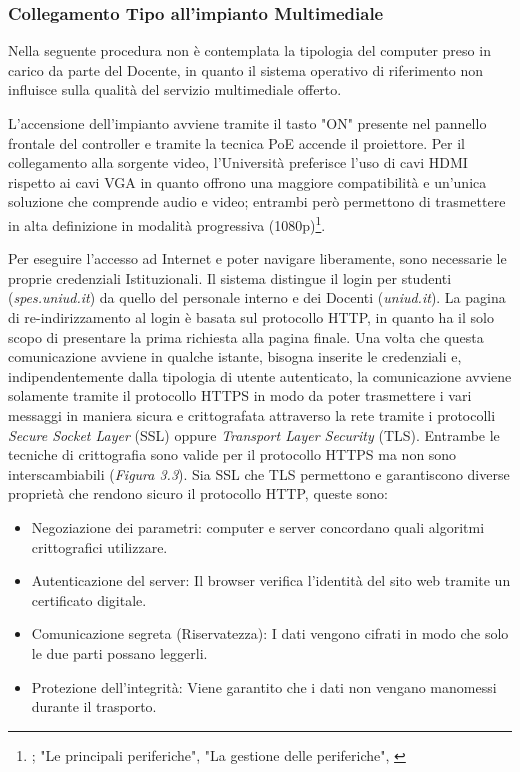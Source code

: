         \subsubsection{Collegamento Tipo all'impianto Multimediale}
            \par
                Nella seguente procedura non è contemplata la tipologia del computer preso in carico da parte del Docente, in quanto il sistema operativo di riferimento non influisce sulla qualità del servizio multimediale offerto. 
            \par
                L'accensione dell'impianto avviene tramite il tasto "ON" presente nel pannello frontale del controller e tramite la tecnica PoE accende il proiettore. Per il collegamento alla sorgente video, l'Università preferisce l'uso di cavi HDMI rispetto ai cavi VGA in quanto offrono una maggiore compatibilità e un'unica soluzione che comprende audio e video; entrambi però permettono di trasmettere in alta definizione in modalità progressiva (1080p)\footnote{\cite{HDMI22Specification}; "Le principali periferiche", "La gestione delle periferiche", \cite{sciutoIntroduzioneAiSistemi2022}}. 
            \par
                Per eseguire l'accesso ad Internet e poter navigare liberamente, sono necessarie le proprie credenziali Istituzionali. Il sistema distingue il login per studenti (\emph{spes.uniud.it}) da quello del personale interno e dei Docenti (\emph{uniud.it}). \newline
                La pagina di re-indirizzamento al login è basata sul protocollo HTTP, in quanto ha il solo scopo di presentare la prima richiesta alla pagina finale. Una volta che questa comunicazione avviene in qualche istante, bisogna inserite le credenziali e, indipendentemente dalla tipologia di utente autenticato, la comunicazione avviene solamente tramite il protocollo HTTPS in modo da poter trasmettere i vari messaggi in maniera sicura e crittografata attraverso la rete tramite i protocolli \textit{Secure Socket Layer} (SSL) oppure \textit{Transport Layer Security} (TLS). Entrambe le tecniche di crittografia sono valide per il protocollo HTTPS ma non sono interscambiabili (\textit{Figura 3.3}). Sia SSL che TLS permettono e garantiscono diverse proprietà che rendono sicuro il protocollo HTTP, queste sono: 
                \begin{itemize}
                    \item Negoziazione dei parametri: computer e server concordano quali algoritmi crittografici utilizzare.
                    \item Autenticazione del server: Il browser verifica l'identità del sito web tramite un certificato digitale.
                    \item Comunicazione segreta (Riservatezza): I dati vengono cifrati in modo che solo le due parti possano leggerli.
                    \item Protezione dell'integrità: Viene garantito che i dati non vengano manomessi durante il trasporto. 
                \end{itemize}
